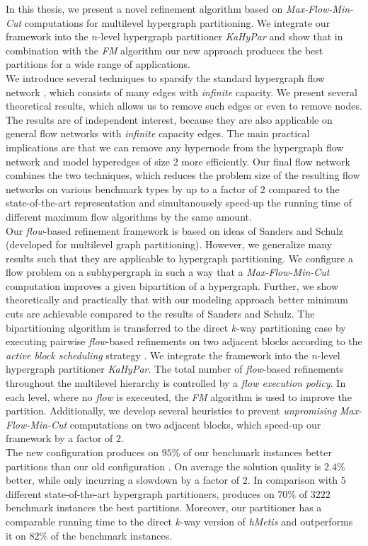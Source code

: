 In this thesis, we present a novel refinement algorithm based on \emph{Max-Flow-Min-Cut}
computations for multilevel hypergraph partitioning. We integrate our framework
into the $n$-level hypergraph partitioner \emph{KaHyPar} and show that
in combination with the \emph{FM} algorithm our new approach produces the best partitions
for a wide range of applications.\\
We introduce several techniques to 
sparsify the standard hypergraph flow network \cite{lawler1973},
which consists of many edges with \emph{infinite} capacity. We present
several theoretical results, which allows us to remove such edges or even to remove
nodes. The results are of independent interest, because they are also
applicable on general flow networks with \emph{infinite} capacity edges.
The main practical implications are that we can remove any hypernode 
from the hypergraph flow network and model hyperedges of size $2$ more efficiently. 
Our final flow network combines the two techniques, which reduces 
the problem size of the resulting flow networks on various benchmark types by up to 
a factor of $2$ compared to the state-of-the-art representation and
simultanousely speed-up the running time of different maximum flow algorithms 
by the same amount.  \\
Our \emph{flow}-based refinement framework is based on ideas of Sanders and Schulz
\cite{sanders2011engineering} (developed for multilevel graph partitioning). However,
we generalize many results such that they are applicable to hypergraph partitioning.
We configure a flow problem on a subhypergraph in such a way that a \emph{Max-Flow-Min-Cut}
computation improves a given bipartition of a hypergraph. Further, we show theoretically
and practically that with our modeling approach better minimum cuts are achievable
compared to the results of Sanders and Schulz. The bipartitioning algorithm is transferred
to the direct $k$-way partitioning case by executing pairwise \emph{flow}-based refinements
on two adjacent blocks according to the \emph{active block scheduling} strategy \cite{holtgrewe2010engineering}.
We integrate the framework into the $n$-level hypergraph partitioner \emph{KaHyPar}.
The total number of \emph{flow}-based refinements throughout the multilevel hierarchy
is controlled by a \emph{flow execution policy}. In each level, where no \emph{flow}
is execeuted, the \emph{FM} algorithm is used to improve the partition. Additionally,
we develop several heuristics to prevent \emph{unpromising} \emph{Max-Flow-Min-Cut}
computations on two adjacent blocks, which speed-up our framework
by a factor of $2$. \\
The new configuration  produces on $95\%$ of our benchmark instances
better partitions than our old configuration . On average the solution 
quality is $2.4\%$ better, while only incurring a slowdown by a factor of $2$. 
In comparison with $5$ different state-of-the-art hypergraph partitioners,  
produces on $70\%$ of $3222$ benchmark instances the best partitions. 
Moreover, our partitioner has a comparable running time to the direct $k$-way
version of \emph{hMetis} and outperforms it on $82\%$ of the benchmark instances.



